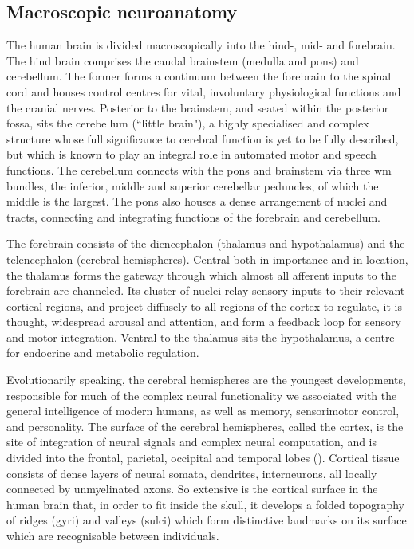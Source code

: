 \subsection{Macroscopic neuroanatomy}

The human brain is divided macroscopically into the hind-, mid- and forebrain.
The hind brain comprises the caudal brainstem (medulla and pons) and cerebellum.
The former forms a continuum between the forebrain to the spinal cord and houses control centres for vital, involuntary physiological functions and the cranial nerves.
Posterior to the brainstem, and seated within the posterior fossa, sits the cerebellum (``little brain"),
a highly specialised and complex structure whose full significance to cerebral function is yet to be fully described, but which is known to play an integral role in automated motor and speech functions.
The cerebellum connects with the pons and brainstem via three \gls{wm} bundles, the inferior, middle and superior cerebellar peduncles, of which the middle is the largest.
The pons also houses a dense arrangement of nuclei and tracts, connecting and integrating functions of the forebrain and cerebellum.

The forebrain consists of the diencephalon (thalamus and hypothalamus) and the telencephalon (cerebral hemispheres).
Central both in importance and in location, the thalamus forms the gateway through which almost all afferent inputs to the forebrain are channeled.
Its cluster of nuclei relay sensory inputs to their relevant cortical regions, and project diffusely to all regions of the cortex to regulate, it is thought, widespread arousal and attention, and form a feedback loop for sensory and motor integration.
Ventral to the thalamus sits the hypothalamus, a centre for endocrine and metabolic regulation.

Evolutionarily speaking, the cerebral hemispheres are the youngest developments, responsible for much of the complex neural functionality we associated with the general intelligence of modern humans, as well as memory, sensorimotor control, and personality.
The surface of the cerebral hemispheres, called the cortex, is the site of integration of neural signals and complex neural computation, and is divided into the frontal, parietal, occipital and temporal lobes ().
Cortical tissue consists of dense layers of neural somata, dendrites, interneurons, all locally connected by unmyelinated axons.
So extensive is the cortical surface in the human brain that, in order to fit inside the skull, it develops a folded topography of ridges (gyri) and valleys (sulci) which form distinctive landmarks on its surface which are recognisable between individuals.

